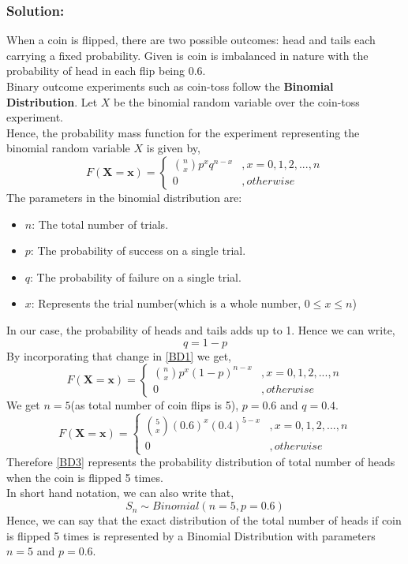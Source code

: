 \documentclass[12pt,twoside,a4paper]{article}
\begin{document}
\subsubsection*{Solution:}
\label{Q1 Solution}
When a coin is flipped, there are two possible outcomes: head and tails each carrying a fixed probability. Given is coin is imbalanced in nature with the probability of head in each flip being \textbf{$0.6$}.\\
Binary outcome experiments such as coin-toss follow the \textbf{Binomial Distribution}. Let $X$ be the binomial random variable over the coin-toss experiment.\\
Hence, the probability mass function for the experiment representing the binomial random variable $X$ is given by,
\begin{equation} \label{BD1}
F(\mathbf{X = x}) = 
    \begin{cases}
        {{n}\choose{x}}p^{x}q^{n-x} & ,x = 0,1,2,...,n\\
        0   & ,otherwise
    \end{cases}
\end{equation}
The parameters in the binomial distribution are:
\begin{itemize}
    \item $n$: The total number of trials.
    \item $p$: The probability of success on a single trial.
    \item $q$: The probability of failure on a single trial.
    \item $x$: Represents the trial number(which is a whole number, $0\le x \le n$)
\end{itemize}
In our case, the probability of heads and tails adds up to 1. Hence we can write,
$$q=1-p$$
By incorporating that change in \eqref{BD1} we get,
\begin{equation} \label{BD2}
F(\mathbf{X = x}) = 
    \begin{cases}
        {{n}\choose{x}}p^{x}(1-p)^{n-x} & ,x = 0,1,2,...,n\\
        0   & ,otherwise
    \end{cases}
\end{equation}
We get $n=5$(as total number of coin flips is 5), $p=0.6$ and $q=0.4$.
\begin{equation} \label{BD3}
F(\mathbf{X = x}) = 
    \begin{cases}
        {{5}\choose{x}}(0.6)^{x}(0.4)^{5-x} & ,x = 0,1,2,...,n\\
        0   & ,otherwise
    \end{cases}
\end{equation}
Therefore \eqref{BD3} represents the probability distribution of total number of heads when the coin is flipped 5 times.\\
In short hand notation, we can also write that,
$$S_n \sim Binomial(n=5, p=0.6)$$
Hence, we can say that the exact distribution of the total number of heads if coin is flipped 5 times is represented by a Binomial Distribution with parameters $n=5$ and $p=0.6$.
\end{document}

